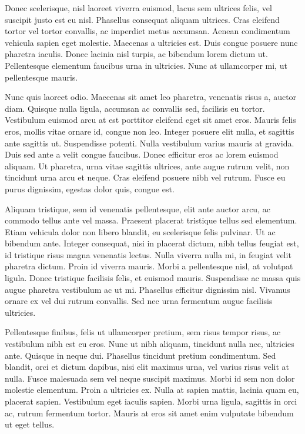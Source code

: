\documentclass{article}
\begin{document}
Donec scelerisque, nisl laoreet viverra euismod, lacus sem ultrices felis, vel suscipit justo est eu nisl. Phasellus consequat aliquam ultrices. Cras eleifend tortor vel tortor convallis, ac imperdiet metus accumsan. Aenean condimentum vehicula sapien eget molestie. Maecenas a ultricies est. Duis congue posuere nunc pharetra iaculis. Donec lacinia nisl turpis, ac bibendum lorem dictum ut. Pellentesque elementum faucibus urna in ultricies. Nunc at ullamcorper mi, ut pellentesque mauris.

Nunc quis laoreet odio. Maecenas sit amet leo pharetra, venenatis risus a, auctor diam. Quisque nulla ligula, accumsan ac convallis sed, facilisis eu tortor. Vestibulum euismod arcu at est porttitor eleifend eget sit amet eros. Mauris felis eros, mollis vitae ornare id, congue non leo. Integer posuere elit nulla, et sagittis ante sagittis ut. Suspendisse potenti. Nulla vestibulum varius mauris at gravida. Duis sed ante a velit congue faucibus. Donec efficitur eros ac lorem euismod aliquam. Ut pharetra, urna vitae sagittis ultrices, ante augue rutrum velit, non tincidunt urna arcu et neque. Cras eleifend posuere nibh vel rutrum. Fusce eu purus dignissim, egestas dolor quis, congue est.

Aliquam tristique, sem id venenatis pellentesque, elit ante auctor arcu, ac commodo tellus ante vel massa. Praesent placerat tristique tellus sed elementum. Etiam vehicula dolor non libero blandit, eu scelerisque felis pulvinar. Ut ac bibendum ante. Integer consequat, nisi in placerat dictum, nibh tellus feugiat est, id tristique risus magna venenatis lectus. Nulla viverra nulla mi, in feugiat velit pharetra dictum. Proin id viverra mauris. Morbi a pellentesque nisl, at volutpat ligula. Donec tristique facilisis felis, et euismod mauris. Suspendisse ac massa quis augue pharetra vestibulum ac ut mi. Phasellus efficitur dignissim nisl. Vivamus ornare ex vel dui rutrum convallis. Sed nec urna fermentum augue facilisis ultricies.

Pellentesque finibus, felis ut ullamcorper pretium, sem risus tempor risus, ac vestibulum nibh est eu eros. Nunc ut nibh aliquam, tincidunt nulla nec, ultricies ante. Quisque in neque dui. Phasellus tincidunt pretium condimentum. Sed blandit, orci et dictum dapibus, nisi elit maximus urna, vel varius risus velit at nulla. Fusce malesuada sem vel neque suscipit maximus. Morbi id sem non dolor molestie elementum. Proin a ultricies ex. Nulla at sapien mattis, lacinia quam eu, placerat sapien. Vestibulum eget iaculis sapien. Morbi urna ligula, sagittis in orci ac, rutrum fermentum tortor. Mauris at eros sit amet enim vulputate bibendum ut eget tellus.
\end{document}
